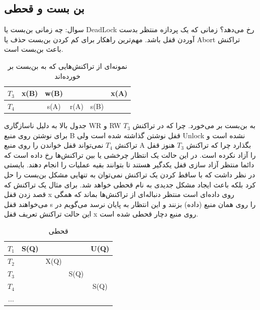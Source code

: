 \documentclass[a4paper]{article}
\begin{document}
\newpage

\subsection{بن بست و قحطی}

سوال: چه زمانی بن‌بست یا DeadLock رخ می‌دهد؟ زمانی که یک پردازه منتظر بدست آوردن
قفل باشد. مهم‌ترین راهکار برای کم کردن بن‌بست حذف یا Abort تراکنش باعث بن‌بست
است.

\begin{LTR}
    \begin{table}[h]
        \begin{RTL}
            \caption{نمونه‌ای از تراکنش‌هایی که به بن‌بست بر خورده‌اند}
        \end{RTL}
        \centering
            \begin{tabular}{c|c|c|c|c|c}
                $T_{3}$ & x(B) & w(B) & & & x(A) \\ \hline
                $T_{4}$ & & s(A) & r(A) & s(B) & \\
            \end{tabular}
    \end{table}
\end{LTR}

جدول بالا به دلیل ناسازگاری WR و RW به بن‌بست بر می‌خورد. چرا که در تراکنش
$T_{3}$ برای نوشتن روی منبع B قفل نوشتن گذاشته شده است ولی Unlock نشده است و
تراکنش $T_{4}$ نمی‌تواند قفل خواندن را روی منبع A بگذارد چرا که تراکنش $T_{3}$
هنوز قفل را آزاد نکرده است. در این حالت یک انتظار چرخشی یا 
بین تراکنش‌ها رخ داده است که دائما منتظر آزاد سازی قفل یکدگیر هستند تا بتوانند
بقیه عملیات را انجام دهند. بایستی در نظر داشت که با ساقط کردن یک تراکنش نمی‌توان
به تنهایی مشکل بن‌بست را حل کرد بلکه باعث ایجاد مشکل جدیدی به نام قحطی خواهد شد.
برای مثال یک تراکنش که قصد زدن قفل x روی داده‌ای است منتظر دنباله‌ای از
تراکنش‌ها بماند که همگی می‌خواهند قفل s را روی همان منبع (داده) بزنند و این
انتظار به پایان نرسد می‌گویم در این حالت تراکنش تعریف قفل x روی منبع دچار قحطی
شده است.

\begin{LTR}
    \begin{table}[h]
        \begin{RTL}
            \caption{قحطی}
        \end{RTL}
        \centering
            \begin{tabular}{c|c|c|c|c}
                $T_{1}$ & S(Q) & & & U(Q) \\ \hline
                $T_{2}$ & & X(Q) & & \\ \hline
                $T_{3}$ & & & S(Q) & \\ \hline
                $T_{4}$ & & & & S(Q) \\ \hline
                $...$ & & & & \\ 
            \end{tabular}
    \end{table}
\end{LTR}
\end{document}
